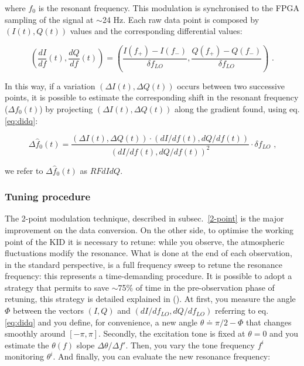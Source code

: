 \documentclass[twocolumn,traditabstract]{aa}\\
\begin{document}
\noindent where $f_0$ is the resonant frequency. This modulation is synchronised to the FPGA sampling of the signal at $\sim$24 Hz. Each raw data point is composed by $(I(t), Q(t))$ values and the corresponding differential values:

\begin{equation}
\left( \frac{dI}{df}(t),\frac{dQ}{df}(t) \right) = \left( \frac{I(f_+)-I(f_-)}{\delta f_{LO}}, \frac{Q(f_+)-Q(f_-)}{\delta f_{LO}} \right) \text{ .}
\label{eq:didq}
\end{equation}

\noindent In this way, if a variation $(\Delta I(t), \Delta Q(t))$ occurs between two successive points, it is possible to estimate the corresponding shift in the resonant frequency ($\Delta f_0(t)$) by projecting
$(\Delta I(t), \Delta Q(t))$ along the gradient found, using 
eq. \ref{eq:didq}:

\begin{equation}
\Delta \hat{f}_0 (t) = \frac{(\Delta I(t), \Delta Q(t))\cdot (dI/df(t),dQ/df(t)  ) }{ ( dI/df(t), dQ/df(t) )^2 }\cdot\delta f_{LO} \text{ ,}
\end{equation}

\noindent we refer to $\Delta \hat{f}_0 (t)$ as $RFdIdQ$.

\subsubsection{Tuning procedure}
\label{sec:tuning}

The 2-point modulation technique, described in subsec.~\ref{2-point} is the major improvement on the data conversion. On the other side, to optimise the working point of the KID it is necessary to retune: while you observe, the atmospheric fluctuations modify the resonance. What is done at the end of each observation, in the standard perspective, is a full frequency sweep to retune the resonance frequency: this represents a time-demanding procedure. It is possible to adopt a strategy that permits to save $\sim$75\% of time in the pre-observation phase of retuning, this strategy is detailed explained in (\cite{2014SPIE.9153E..02C}). At first, you measure the angle $\Phi$ between the vectors $(I,Q)$ and $(dI/df_{LO},dQ/df_{LO})$ referring to eq. \ref{eq:didq} and you define, for convenience, a new angle $\theta\doteq \pi/2-\Phi$ that changes smoothly around $[-\pi,\pi]$. Secondly, the excitation tone is fixed at $\theta=0$ and you estimate the $\theta(f)$ slope $\Delta\theta/\Delta f'$. Then, you vary the tone frequency $f^i$ monitoring $\theta^i$. And finally, you can evaluate the new resonance frequency:
\end{document}
